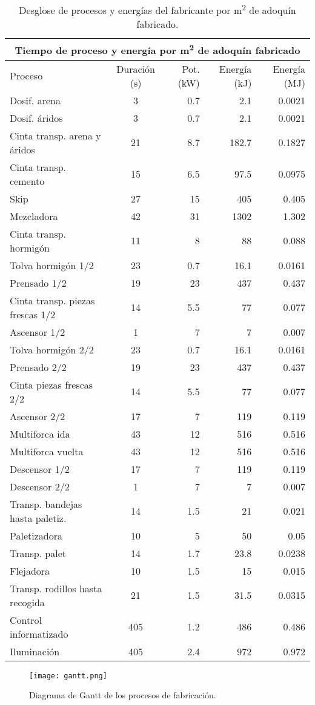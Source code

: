 \begin{table}[!htp]
\centering
\begin{tabular}{lcrrr}
\toprule
\multicolumn{5}{c}{Tiempo de proceso y energía por \si{m^2} de adoquín fabricado}\\
\midrule
Proceso & Duración (\si{s}) & Pot. (\si{kW}) & Energía (\si{kJ}) & Energía (\si{MJ})\\
\midrule
Dosif. arena & 3 & 0.7 & 2.1 & 0.0021\\
Dosif. áridos & 3 & 0.7 & 2.1 & 0.0021\\
Cinta transp. arena y áridos  & 21 & 8.7 & 182.7 & 0.1827\\
Cinta transp. cemento & 15 & 6.5 & 97.5 & 0.0975\\
Skip  & 27 & 15 & 405 & 0.405\\
Mezcladora & 42 & 31 & 1302 & 1.302\\
Cinta transp. hormigón & 11 & 8 & 88 & 0.088\\
Tolva hormigón 1/2 & 23 & 0.7 & 16.1 & 0.0161\\
Prensado 1/2 & 19 & 23 & 437 & 0.437\\
Cinta transp. piezas frescas 1/2 & 14 & 5.5 & 77 & 0.077\\
Ascensor 1/2 & 1 & 7 & 7 & 0.007\\
Tolva hormigón 2/2 & 23 & 0.7 & 16.1 & 0.0161\\
Prensado 2/2 & 19 & 23 & 437 & 0.437\\
Cinta piezas frescas 2/2 & 14 & 5.5 & 77 & 0.077\\
Ascensor 2/2 & 17 & 7 & 119 & 0.119\\
Multiforca ida & 43 & 12 & 516 & 0.516\\
Multiforca vuelta & 43 & 12 & 516 & 0.516\\
Descensor 1/2 & 17 & 7 & 119 & 0.119\\
Descensor 2/2 & 1 & 7 & 7 & 0.007\\
Transp. bandejas hasta paletiz. & 14 & 1.5 & 21 & 0.021\\
Paletizadora & 10 & 5 & 50 & 0.05\\
Transp. palet & 14 & 1.7 & 23.8 & 0.0238\\
Flejadora & 10 & 1.5 & 15 & 0.015\\
Transp. rodillos hasta recogida  & 21 & 1.5 & 31.5 & 0.0315\\
Control informatizado & 405 & 1.2 & 486 & 0.486\\
Iluminación & 405 & 2.4 & 972 & 0.972\\
\bottomrule
\end{tabular}
\caption{Desglose de procesos y energías del fabricante por \si{m^2} de adoquín fabricado.}
\label{desgloseenergia}
\end{table}

\begin{figure}[!htb]
\centering
\texttt{[image: gantt.png]}
\caption{Diagrama de Gantt de los procesos de fabricación.}
\label{fig:gant}
\end{figure}
